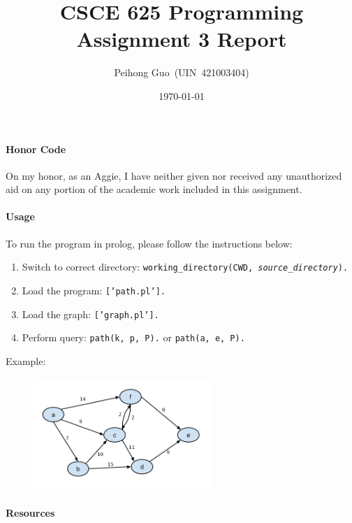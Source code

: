\documentclass{article}
\title{CSCE 625 Programming Assignment 3 Report}
\author{Peihong Guo~(UIN~421003404)}
\date{\today}
\begin{document}
\paragraph{Honor Code}On my honor, as an Aggie, I have neither given nor received any unauthorized aid on any portion of the academic work included in this assignment.

\paragraph{Usage} To run the program in prolog, please follow the instructions below:
\begin{enumerate}
\item Switch to correct directory: \texttt{working_directory(CWD, \textit{source_directory}).}
\item Load the program: \texttt{['path.pl'].}
\item Load the graph: \texttt{['graph.pl'].}
\item Perform query: \texttt{path(k, p, P).} or \texttt{path(a, e, P).}
\end{enumerate}

Example:
\begin{figure}[htbp]
\center
\includegraphics[width=0.6\textwidth]{./graph.png}
\end{figure}


\paragraph{Resources}

\maketitle
\end{document}
